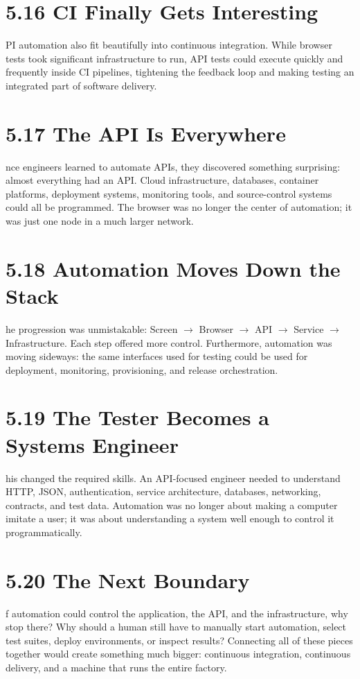 \documentclass[11pt, a4paper, openany]{book}
\newcommand{\initialcap}[1]{{\fontfamily{lmss}\selectfont\huge\textbf{#1}}}
\begin{document}
\section{5.16 CI Finally Gets Interesting}
\noindent \initialcap{A}PI automation also fit beautifully into continuous integration. While browser tests took significant infrastructure to run, API tests could execute quickly and frequently inside CI pipelines, tightening the feedback loop and making testing an integrated part of software delivery.

\section{5.17 The API Is Everywhere}
\noindent \initialcap{O}nce engineers learned to automate APIs, they discovered something surprising: almost everything had an API. Cloud infrastructure, databases, container platforms, deployment systems, monitoring tools, and source-control systems could all be programmed. The browser was no longer the center of automation; it was just one node in a much larger network.

\section{5.18 Automation Moves Down the Stack}
\noindent \initialcap{T}he progression was unmistakable: Screen $\rightarrow$ Browser $\rightarrow$ API $\rightarrow$ Service $\rightarrow$ Infrastructure. Each step offered more control. Furthermore, automation was moving sideways: the same interfaces used for testing could be used for deployment, monitoring, provisioning, and release orchestration.

\section{5.19 The Tester Becomes a Systems Engineer}
\noindent \initialcap{T}his changed the required skills. An API-focused engineer needed to understand HTTP, JSON, authentication, service architecture, databases, networking, contracts, and test data. Automation was no longer about making a computer imitate a user; it was about understanding a system well enough to control it programmatically.

\section{5.20 The Next Boundary}
\noindent \initialcap{I}f automation could control the application, the API, and the infrastructure, why stop there? Why should a human still have to manually start automation, select test suites, deploy environments, or inspect results? Connecting all of these pieces together would create something much bigger: continuous integration, continuous delivery, and a machine that runs the entire factory.
\end{document}
